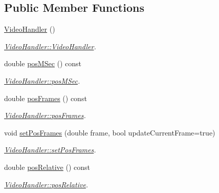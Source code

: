\subsection*{Public Member Functions}
\begin{DoxyCompactItemize}
\item 
\hyperlink{classVideoHandler_ac25de5d277b6a3d8bf09df2f33df281d}{Video\+Handler} ()\hypertarget{classVideoHandler_ac25de5d277b6a3d8bf09df2f33df281d}{}\label{classVideoHandler_ac25de5d277b6a3d8bf09df2f33df281d}

\begin{DoxyCompactList}\small\item\em \hyperlink{classVideoHandler_ac25de5d277b6a3d8bf09df2f33df281d}{Video\+Handler\+::\+Video\+Handler}. \end{DoxyCompactList}\item 
double \hyperlink{classVideoHandler_acbe73f36a1f9c8e63486f40a3378bdbc}{pos\+M\+Sec} () const 
\begin{DoxyCompactList}\small\item\em \hyperlink{classVideoHandler_acbe73f36a1f9c8e63486f40a3378bdbc}{Video\+Handler\+::pos\+M\+Sec}. \end{DoxyCompactList}\item 
double \hyperlink{classVideoHandler_a8bef55832d29ab40eb707f0b931e4658}{pos\+Frames} () const 
\begin{DoxyCompactList}\small\item\em \hyperlink{classVideoHandler_a8bef55832d29ab40eb707f0b931e4658}{Video\+Handler\+::pos\+Frames}. \end{DoxyCompactList}\item 
void \hyperlink{classVideoHandler_a89ca1772249f84f62f8854670ed71024}{set\+Pos\+Frames} (double frame, bool update\+Current\+Frame=true)
\begin{DoxyCompactList}\small\item\em \hyperlink{classVideoHandler_a89ca1772249f84f62f8854670ed71024}{Video\+Handler\+::set\+Pos\+Frames}. \end{DoxyCompactList}\item 
double \hyperlink{classVideoHandler_af025d2ccbde21a6b4b7b47cda9336091}{pos\+Relative} () const 
\begin{DoxyCompactList}\small\item\em \hyperlink{classVideoHandler_af025d2ccbde21a6b4b7b47cda9336091}{Video\+Handler\+::pos\+Relative}. \end{DoxyCompactList}\item 

\end{DoxyCompactItemize}
